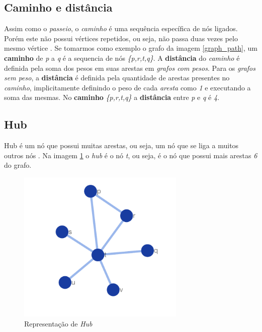 \subsection{Caminho e distância}
Assim como o \textit{passeio}, o \textit{caminho} é uma sequência específica de nós ligados. Porém este não possui vértices repetidos, ou seja, não passa duas vezes pelo mesmo vértice \cite{Pavlopoulos2011}. 
Se tomarmos como exemplo o grafo da imagem \ref{graph_path}, um \textbf{caminho} de \textit{p} a \textit{q} é a sequencia de nós \textit{\{p,r,t,q\}}. 
A \textbf{distância} do \textit{caminho} é definida pela soma dos pesos em suas arestas em \textit{grafos com pesos}. Para os \textit{grafos sem peso}, a \textbf{distância} é definida pela quantidade de arestas presentes no \textit{caminho}, implicitamente definindo o peso de cada \textit{aresta} como \textit{1} e executando a soma das mesmas.
No \textbf{caminho} \textit{\{p,r,t,q\}} a \textbf{distância} entre \textit{p} e \textit{q} é \textit{4}.





\subsection{Hub}
Hub é um nó que possui muitas arestas, ou seja, um nó que se liga a muitos outros nós \cite{Pavlopoulos2011}.
Na imagem \ref{graph_hub} o \textsl{hub} é o nó \textsl{t}, ou seja, é o nó que possui mais arestas \textsl{6} do grafo.
%
\begin{figure}[ht!]
\centering
\includegraphics[width=80mm]{Images/graph_hub.png}
\caption {Representação de \textsl{Hub}
\label{graph_hub}}
\end{figure}


